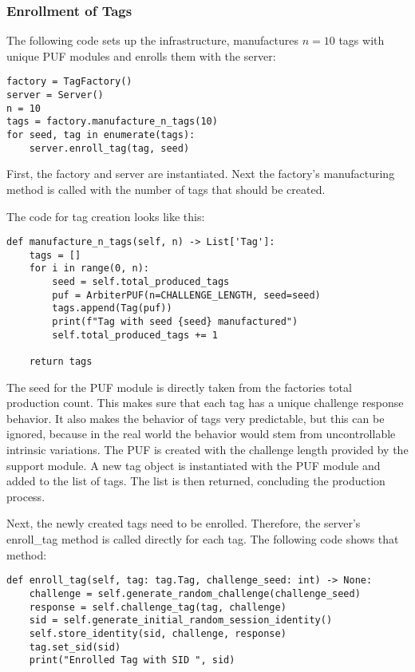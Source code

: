 \subsubsection{Enrollment of Tags}

The following code sets up the infrastructure,
manufactures $n = 10$ tags with unique PUF modules and enrolls them with the server:

\begin{lstlisting}
factory = TagFactory()
server = Server()
n = 10
tags = factory.manufacture_n_tags(10)
for seed, tag in enumerate(tags):
    server.enroll_tag(tag, seed)
\end{lstlisting}

First, the factory and server are instantiated.
Next the factory's manufacturing method is called with the number of tags that should be created.

The code for tag creation looks like this:

\begin{lstlisting}
def manufacture_n_tags(self, n) -> List['Tag']:
    tags = []
    for i in range(0, n):
        seed = self.total_produced_tags
        puf = ArbiterPUF(n=CHALLENGE_LENGTH, seed=seed)
        tags.append(Tag(puf))
        print(f"Tag with seed {seed} manufactured")
        self.total_produced_tags += 1

    return tags
\end{lstlisting}

The seed for the PUF module is directly taken from the factories total production count.
This makes sure that each tag has a unique challenge response behavior. It also makes the behavior
of tags very predictable, but this can be ignored, because in the real world the behavior
would stem from uncontrollable intrinsic variations.
The PUF is created with the challenge length provided by the support module.
A new tag object is instantiated with the PUF module and added to the list of tags.
The list is then returned, concluding the production process.

Next, the newly created tags need to be enrolled.
Therefore, the server's enroll\_tag method is called directly for each tag.
The following code shows that method:

\begin{lstlisting}
def enroll_tag(self, tag: tag.Tag, challenge_seed: int) -> None:
    challenge = self.generate_random_challenge(challenge_seed)
    response = self.challenge_tag(tag, challenge)
    sid = self.generate_initial_random_session_identity()
    self.store_identity(sid, challenge, response)
    tag.set_sid(sid)
    print("Enrolled Tag with SID ", sid)
\end{lstlisting}

